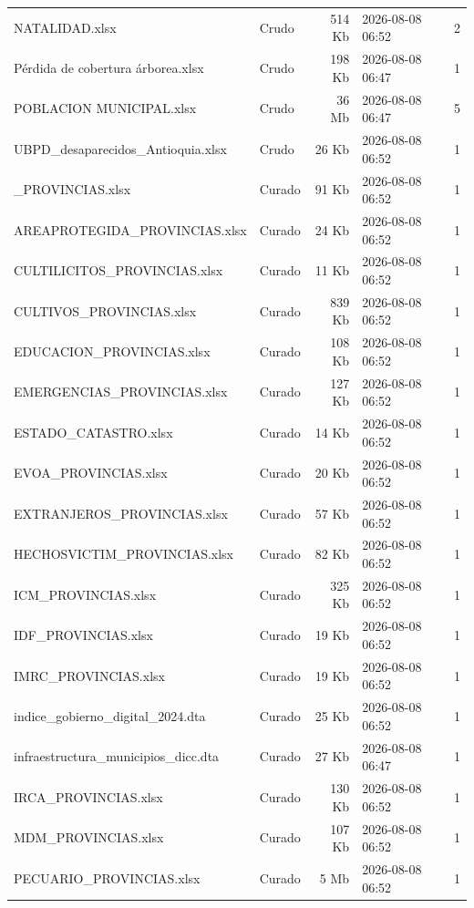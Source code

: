 \begin{tabularx}{\linewidth}{>{\raggedright\arraybackslash}X l r l r}
NATALIDAD.xlsx & Crudo & 514 Kb & 2026-08-08 06:52 & 2 \\
Pérdida de cobertura árborea.xlsx & Crudo & 198 Kb & 2026-08-08 06:47 & 1 \\
POBLACION MUNICIPAL.xlsx & Crudo & 36 Mb & 2026-08-08 06:47 & 5 \\
UBPD\_\allowbreak{}desaparecidos\_\allowbreak{}Antioquia.xlsx & Crudo & 26 Kb & 2026-08-08 06:52 & 1 \\
617\_\allowbreak{}PROVINCIAS.xlsx & Curado & 91 Kb & 2026-08-08 06:52 & 1 \\
AREAPROTEGIDA\_\allowbreak{}PROVINCIAS.xlsx & Curado & 24 Kb & 2026-08-08 06:52 & 1 \\
CULTILICITOS\_\allowbreak{}PROVINCIAS.xlsx & Curado & 11 Kb & 2026-08-08 06:52 & 1 \\
CULTIVOS\_\allowbreak{}PROVINCIAS.xlsx & Curado & 839 Kb & 2026-08-08 06:52 & 1 \\
EDUCACION\_\allowbreak{}PROVINCIAS.xlsx & Curado & 108 Kb & 2026-08-08 06:52 & 1 \\
EMERGENCIAS\_\allowbreak{}PROVINCIAS.xlsx & Curado & 127 Kb & 2026-08-08 06:52 & 1 \\
ESTADO\_\allowbreak{}CATASTRO.xlsx & Curado & 14 Kb & 2026-08-08 06:52 & 1 \\
EVOA\_\allowbreak{}PROVINCIAS.xlsx & Curado & 20 Kb & 2026-08-08 06:52 & 1 \\
EXTRANJEROS\_\allowbreak{}PROVINCIAS.xlsx & Curado & 57 Kb & 2026-08-08 06:52 & 1 \\
HECHOSVICTIM\_\allowbreak{}PROVINCIAS.xlsx & Curado & 82 Kb & 2026-08-08 06:52 & 1 \\
ICM\_\allowbreak{}PROVINCIAS.xlsx & Curado & 325 Kb & 2026-08-08 06:52 & 1 \\
IDF\_\allowbreak{}PROVINCIAS.xlsx & Curado & 19 Kb & 2026-08-08 06:52 & 1 \\
IMRC\_\allowbreak{}PROVINCIAS.xlsx & Curado & 19 Kb & 2026-08-08 06:52 & 1 \\
indice\_\allowbreak{}gobierno\_\allowbreak{}digital\_\allowbreak{}2024.dta & Curado & 25 Kb & 2026-08-08 06:52 & 1 \\
infraestructura\_\allowbreak{}municipios\_\allowbreak{}dicc.dta & Curado & 27 Kb & 2026-08-08 06:47 & 1 \\
IRCA\_\allowbreak{}PROVINCIAS.xlsx & Curado & 130 Kb & 2026-08-08 06:52 & 1 \\
MDM\_\allowbreak{}PROVINCIAS.xlsx & Curado & 107 Kb & 2026-08-08 06:52 & 1 \\
PECUARIO\_\allowbreak{}PROVINCIAS.xlsx & Curado & 5 Mb & 2026-08-08 06:52 & 1 \\

\end{tabularx}
